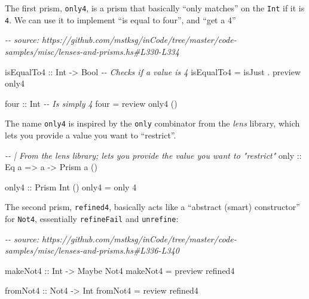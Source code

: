 \documentclass[]{article}
\newenvironment{Shaded}{}{}
\newcommand{\CommentTok}[1]{\textcolor[rgb]{0.38,0.63,0.69}{\textit{#1}}}
\newcommand{\DataTypeTok}[1]{\textcolor[rgb]{0.56,0.13,0.00}{#1}}
\newcommand{\DecValTok}[1]{\textcolor[rgb]{0.25,0.63,0.44}{#1}}
\newcommand{\NormalTok}[1]{#1}
\newcommand{\OperatorTok}[1]{\textcolor[rgb]{0.40,0.40,0.40}{#1}}
\newcommand{\OtherTok}[1]{\textcolor[rgb]{0.00,0.44,0.13}{#1}}
\begin{document}
The first prism, \texttt{only4}, is a prism that basically ``only matches'' on
the \texttt{Int} if it is \texttt{4}. We can use it to implement ``is equal to
four'', and ``get a 4''

\begin{Shaded}
\begin{Highlighting}[]
\CommentTok{{-}{-} source: https://github.com/mstksg/inCode/tree/master/code{-}samples/misc/lenses{-}and{-}prisms.hs\#L330{-}L334}

\OtherTok{isEqualTo4 ::} \DataTypeTok{Int} \OtherTok{{-}\textgreater{}} \DataTypeTok{Bool}   \CommentTok{{-}{-} Checks if a value is 4}
\NormalTok{isEqualTo4 }\OtherTok{=}\NormalTok{ isJust }\OperatorTok{.}\NormalTok{ preview only4}

\OtherTok{four ::} \DataTypeTok{Int}     \CommentTok{{-}{-} Is simply \textasciigrave{}4\textasciigrave{}}
\NormalTok{four }\OtherTok{=}\NormalTok{ review only4 ()}
\end{Highlighting}
\end{Shaded}

The name \texttt{only4} is inspired by the \texttt{only} combinator from the
\emph{lens} library, which lets you provide a value you want to ``restrict''.

\begin{Shaded}
\begin{Highlighting}[]
\CommentTok{{-}{-} | From the lens library; lets you provide the value you want to "restrict"}
\OtherTok{only ::} \DataTypeTok{Eq}\NormalTok{ a }\OtherTok{=\textgreater{}}\NormalTok{ a }\OtherTok{{-}\textgreater{}} \DataTypeTok{Prism\textquotesingle{}}\NormalTok{ a ()}

\OtherTok{only4 ::} \DataTypeTok{Prism\textquotesingle{}} \DataTypeTok{Int}\NormalTok{ ()}
\NormalTok{only4 }\OtherTok{=}\NormalTok{ only }\DecValTok{4}
\end{Highlighting}
\end{Shaded}

The second prism, \texttt{refined4}, basically acts like a ``abstract (smart)
constructor'' for \texttt{Not4}, essentially \texttt{refineFail} and
\texttt{unrefine}:

\begin{Shaded}
\begin{Highlighting}[]
\CommentTok{{-}{-} source: https://github.com/mstksg/inCode/tree/master/code{-}samples/misc/lenses{-}and{-}prisms.hs\#L336{-}L340}

\OtherTok{makeNot4 ::} \DataTypeTok{Int} \OtherTok{{-}\textgreater{}} \DataTypeTok{Maybe} \DataTypeTok{Not4}
\NormalTok{makeNot4 }\OtherTok{=}\NormalTok{ preview refined4}

\OtherTok{fromNot4 ::} \DataTypeTok{Not4} \OtherTok{{-}\textgreater{}} \DataTypeTok{Int}
\NormalTok{fromNot4 }\OtherTok{=}\NormalTok{ review refined4}
\end{Highlighting}
\end{Shaded}
\end{document}
